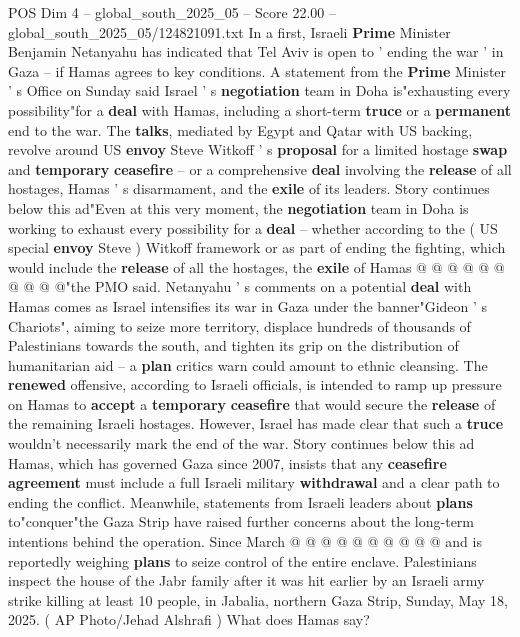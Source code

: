 \begin{textsample}{POS Dim 4 – global\_south\_2025\_05 – Score 22.00 – global\_south\_2025\_05/124821091.txt}  \label{ex:f4_pos_095}
In a first, Israeli \textbf{Prime} Minister Benjamin Netanyahu has indicated that Tel Aviv is open to ' ending the war ' in Gaza -- if Hamas agrees to key conditions.
A statement from the \textbf{Prime} Minister ' s Office on Sunday said Israel ' s \textbf{negotiation} team in Doha is"exhausting every possibility"for a \textbf{deal} with Hamas, including a short-term \textbf{truce} or a \textbf{permanent} end to the war.
The \textbf{talks}, mediated by Egypt and Qatar with US backing, revolve around US \textbf{envoy} Steve Witkoff ' s \textbf{proposal} for a limited hostage \textbf{swap} and \textbf{temporary} \textbf{ceasefire} -- or a comprehensive \textbf{deal} involving the \textbf{release} of all hostages, Hamas ' s disarmament, and the \textbf{exile} of its leaders.
Story continues below this ad"Even at this very moment, the \textbf{negotiation} team in Doha is working to exhaust every possibility for a \textbf{deal} -- whether according to the ( US special \textbf{envoy} Steve ) Witkoff framework or as part of ending the fighting, which would include the \textbf{release} of all the hostages, the \textbf{exile} of Hamas @ @ @ @ @ @ @ @ @ @"the PMO said.
Netanyahu ' s comments on a potential \textbf{deal} with Hamas comes as Israel intensifies its war in Gaza under the banner"Gideon ' s Chariots", aiming to seize more territory, displace hundreds of thousands of Palestinians towards the south, and tighten its grip on the distribution of humanitarian aid -- a \textbf{plan} critics warn could amount to ethnic cleansing.
The \textbf{renewed} offensive, according to Israeli officials, is intended to ramp up pressure on Hamas to \textbf{accept} a \textbf{temporary} \textbf{ceasefire} that would secure the \textbf{release} of the remaining Israeli hostages.
However, Israel has made clear that such a \textbf{truce} wouldn't necessarily mark the end of the war.
Story continues below this ad Hamas, which has governed Gaza since 2007, insists that any \textbf{ceasefire} \textbf{agreement} must include a full Israeli military \textbf{withdrawal} and a clear path to ending the conflict.
Meanwhile, statements from Israeli leaders about \textbf{plans} to"conquer"the Gaza Strip have raised further concerns about the long-term intentions behind the operation.
Since March @ @ @ @ @ @ @ @ @ @ and is reportedly weighing \textbf{plans} to seize control of the entire enclave.
Palestinians inspect the house of the Jabr family after it was hit earlier by an Israeli army strike killing at least 10 people, in Jabalia, northern Gaza Strip, Sunday, May 18, 2025. ( AP Photo/Jehad Alshrafi ) What does Hamas say?

\end{textsample}
